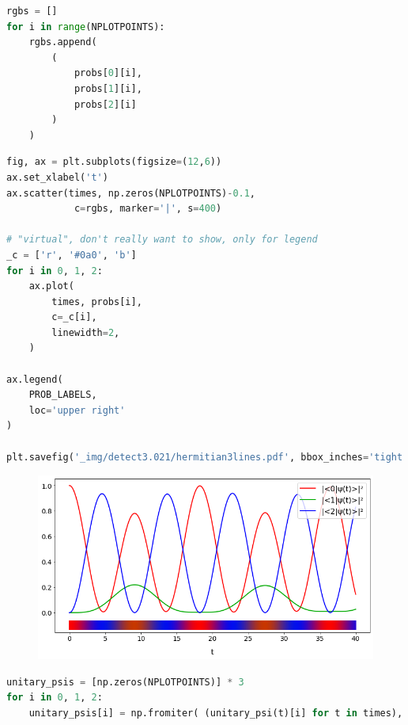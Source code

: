 \begin{lstlisting}[language=Python]
rgbs = []
for i in range(NPLOTPOINTS):
    rgbs.append(
        (
            probs[0][i],
            probs[1][i],
            probs[2][i]
        )
    )
\end{lstlisting}

\begin{lstlisting}[language=Python]
fig, ax = plt.subplots(figsize=(12,6))
ax.set_xlabel('t')
ax.scatter(times, np.zeros(NPLOTPOINTS)-0.1,
            c=rgbs, marker='|', s=400)

# "virtual", don't really want to show, only for legend
_c = ['r', '#0a0', 'b']
for i in 0, 1, 2:
    ax.plot(
        times, probs[i],
        c=_c[i],
        linewidth=2,
    )
    
ax.legend(
    PROB_LABELS,
    loc='upper right'
)

plt.savefig('_img/detect3.021/hermitian3lines.pdf', bbox_inches='tight', pad_inches=0)
\end{lstlisting}

\begin{figure}[h!]
\centering
\includegraphics[width=0.66\linewidth]{tex/appendix/nb/jupyter/3lev/output_22_0.png}

\end{figure}

\begin{lstlisting}[language=Python]
unitary_psis = [np.zeros(NPLOTPOINTS)] * 3
for i in 0, 1, 2:
    unitary_psis[i] = np.fromiter( (unitary_psi(t)[i] for t in times), np.complex )
\end{lstlisting}


